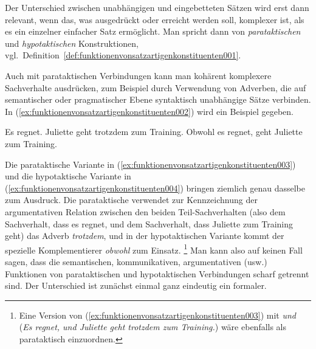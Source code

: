 Der Unterschied zwischen unabhängigen und eingebetteten Sätzen wird erst dann relevant, wenn das, was ausgedrückt oder erreicht werden soll, komplexer ist, als es ein einzelner einfacher Satz ermöglicht.
Man spricht dann von \textit{parataktischen} und \textit{hypotaktischen} Konstruktionen, vgl.\ Definition~\ref{def:funktionenvonsatzartigenkonstituenten001}.




Auch mit parataktischen Verbindungen kann man kohärent komplexere Sachverhalte ausdrücken, zum Beispiel durch Verwendung von Adverben, die auf semantischer oder pragmatischer Ebene syntaktisch unabhängige Sätze verbinden.
In (\ref{ex:funktionenvonsatzartigenkonstituenten002}) wird ein Beispiel gegeben.

\begin{exe}
  \ex\label{ex:funktionenvonsatzartigenkonstituenten002} 
  \begin{xlist}
    \ex\label{ex:funktionenvonsatzartigenkonstituenten003} Es regnet. Juliette geht trotzdem zum Training.
    \ex\label{ex:funktionenvonsatzartigenkonstituenten004} Obwohl es regnet, geht Juliette zum Training.
  \end{xlist}
\end{exe}

Die parataktische Variante in (\ref{ex:funktionenvonsatzartigenkonstituenten003}) und die hypotaktische Variante in (\ref{ex:funktionenvonsatzartigenkonstituenten004}) bringen ziemlich genau dasselbe zum Ausdruck.
Die parataktische verwendet zur Kennzeichnung der argumentativen Relation zwischen den beiden Teil-Sachverhalten (also dem Sachverhalt, dass es regnet, und dem Sachverhalt, dass Juliette zum Training geht) das Adverb \textit{trotzdem}, und in der hypotaktischen Variante kommt der spezielle Komplementierer \textit{obwohl} zum Einsatz.%
\footnote{Eine Version von (\ref{ex:funktionenvonsatzartigenkonstituenten003}) mit \textit{und} (\textit{Es regnet, und Juliette geht trotzdem zum Training.}) wäre ebenfalls als parataktisch einzuordnen.}
Man kann also auf keinen Fall sagen, dass die semantischen, kommunikativen, argumentativen (usw.) Funktionen von parataktischen und hypotaktischen Verbindungen scharf getrennt sind.
Der Unterschied ist zunächst einmal ganz eindeutig ein formaler.

